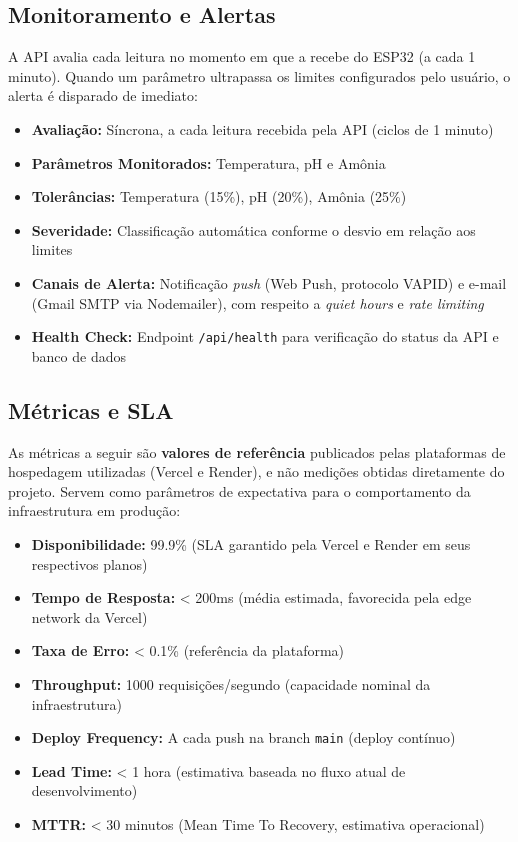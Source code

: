 \documentclass[11pt,a4paper]{article}
\begin{document}
\subsection{Monitoramento e Alertas}
A API avalia cada leitura no momento em que a recebe do ESP32 (a cada 1 minuto). Quando um parâmetro ultrapassa os limites configurados pelo usuário, o alerta é disparado de imediato:
\begin{itemize}
    \item \textbf{Avaliação:} Síncrona, a cada leitura recebida pela API (ciclos de 1 minuto)
    \item \textbf{Parâmetros Monitorados:} Temperatura, pH e Amônia
    \item \textbf{Tolerâncias:} Temperatura (15\%), pH (20\%), Amônia (25\%)
    \item \textbf{Severidade:} Classificação automática conforme o desvio em relação aos limites
    \item \textbf{Canais de Alerta:} Notificação \textit{push} (Web Push, protocolo VAPID) e e-mail (Gmail SMTP via Nodemailer), com respeito a \textit{quiet hours} e \textit{rate limiting}
    \item \textbf{Health Check:} Endpoint \texttt{/api/health} para verificação do status da API e banco de dados
\end{itemize}

\subsection{Métricas e SLA}

As métricas a seguir são \textbf{valores de referência} publicados pelas plataformas de hospedagem utilizadas (Vercel e Render), e não medições obtidas diretamente do projeto. Servem como parâmetros de expectativa para o comportamento da infraestrutura em produção:

\begin{itemize}
    \item \textbf{Disponibilidade:} 99.9\% (SLA garantido pela Vercel e Render em seus respectivos planos)
    \item \textbf{Tempo de Resposta:} < 200ms (média estimada, favorecida pela edge network da Vercel)
    \item \textbf{Taxa de Erro:} < 0.1\% (referência da plataforma)
    \item \textbf{Throughput:} 1000 requisições/segundo (capacidade nominal da infraestrutura)
    \item \textbf{Deploy Frequency:} A cada push na branch \texttt{main} (deploy contínuo)
    \item \textbf{Lead Time:} < 1 hora (estimativa baseada no fluxo atual de desenvolvimento)
    \item \textbf{MTTR:} < 30 minutos (Mean Time To Recovery, estimativa operacional)
\end{itemize}
\end{document}

